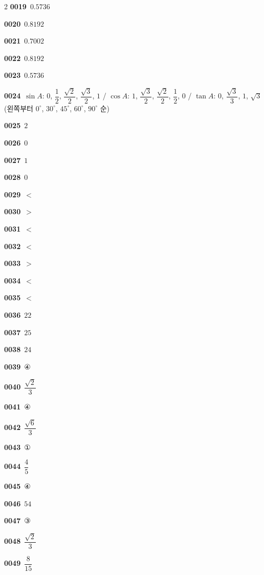 \documentclass[10pt,a4paper]{article}
\begin{document}
\begin{multicols}{2}
\noindent\textbf{0019}\ $0.5736$\par
\noindent\textbf{0020}\ $0.8192$\par
\noindent\textbf{0021}\ $0.7002$\par
\noindent\textbf{0022}\ $0.8192$\par
\noindent\textbf{0023}\ $0.5736$\par
\noindent\textbf{0024}\ $\sin A$: $0$, $\dfrac{1}{2}$, $\dfrac{\sqrt{2}}{2}$, $\dfrac{\sqrt{3}}{2}$, $1$ / $\cos A$: $1$, $\dfrac{\sqrt{3}}{2}$, $\dfrac{\sqrt{2}}{2}$, $\dfrac{1}{2}$, $0$ / $\tan A$: $0$, $\dfrac{\sqrt{3}}{3}$, $1$, $\sqrt{3}$ (왼쪽부터 $0^\circ$, $30^\circ$, $45^\circ$, $60^\circ$, $90^\circ$ 순)\par
\noindent\textbf{0025}\ $2$\par
\noindent\textbf{0026}\ $0$\par
\noindent\textbf{0027}\ $1$\par
\noindent\textbf{0028}\ $0$\par
\noindent\textbf{0029}\ $<$\par
\noindent\textbf{0030}\ $>$\par
\noindent\textbf{0031}\ $<$\par
\noindent\textbf{0032}\ $<$\par
\noindent\textbf{0033}\ $>$\par
\noindent\textbf{0034}\ $<$\par
\noindent\textbf{0035}\ $<$\par
\noindent\textbf{0036}\ $22$\par
\noindent\textbf{0037}\ $25$\par
\noindent\textbf{0038}\ $24$\par
\noindent\textbf{0039}\ ④\par
\noindent\textbf{0040}\ $\dfrac{\sqrt{2}}{3}$\par
\noindent\textbf{0041}\ ④\par
\noindent\textbf{0042}\ $\dfrac{\sqrt{6}}{3}$\par
\noindent\textbf{0043}\ ①\par
\noindent\textbf{0044}\ $\dfrac{4}{5}$\par
\noindent\textbf{0045}\ ④\par
\noindent\textbf{0046}\ $54$\par
\noindent\textbf{0047}\ ③\par
\noindent\textbf{0048}\ $\dfrac{\sqrt{2}}{3}$\par
\noindent\textbf{0049}\ $\dfrac{8}{15}$\par

\end{multicols}
\end{document}
